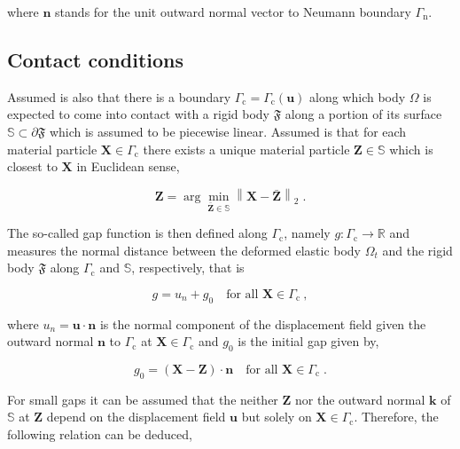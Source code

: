 \documentclass[10pt,a4paper]{article}
\begin{document}
where $\mathbf{n}$ stands for the unit outward normal vector to Neumann boundary $\Gamma_{\text{n}}$.

\subsection{Contact conditions}\label{subsec:contact_conditions}

Assumed is also that there is a boundary $\Gamma_{\text{c}} = \Gamma_{\text{c}} (\mathbf{u})$ along which body $\Omega$ is expected to come into contact with a rigid body $\mathfrak{F}$ along a portion of its surface $\mathbb{S} \subset \partial \mathfrak{F}$ which is assumed to be piecewise linear. Assumed is that for each material particle $\mathbf{X} \in \Gamma_{\text{c}}$ there exists a unique material particle $\mathbf{Z} \in \mathbb{S}$ which is closest to $\mathbf{X}$ in Euclidean sense,

\begin{equation}
	\mathbf{Z} = \arg \min_{\bar{\mathbf{Z}} \in \mathbb{S}} \left\| \mathbf{X} - \bar{\mathbf{Z}} \right\|_2 \;. \label{eq:euclidean_distance}
\end{equation}

The so-called gap function is then defined along $\Gamma_{\text{c}}$, namely $g:\Gamma_{\text{c}} \rightarrow \mathbb{R}$ and measures the normal distance between the deformed elastic body $\Omega_t$ and the rigid body $\mathfrak{F}$ along $\Gamma_{\text{c}}$ and $\mathbb{S}$, respectively, that is

\begin{equation}
	g =  u_n + g_0 \quad \text{for all }\mathbf{X} \in \Gamma_{\text{c}} \:, \label{eq:gap_function}
\end{equation}

where $u_n = \mathbf{u} \cdot\mathbf{n}$ is the normal component of the displacement field given the outward normal $\mathbf{n}$ to $\Gamma_{\text{c}}$ at $\mathbf{X} \in \Gamma_{\text{c}}$ and $g_0$ is the initial gap given by,

\begin{equation}
	g_0 = \left( \mathbf{X} - \mathbf{Z} \right) \cdot \mathbf{n} \quad \text{for all }\mathbf{X} \in \Gamma_{\text{c}} \;. \label{eq:initial_gap}
\end{equation}

For small gaps it can be assumed that the neither $\mathbf{Z}$ nor the outward normal $\mathbf{k}$ of $\mathbb{S}$ at $\mathbf{Z}$ depend on the displacement field $\mathbf{u}$ but solely on $\mathbf{X} \in \Gamma_{\text{c}}$. Therefore, the following relation can be deduced,
\end{document}
